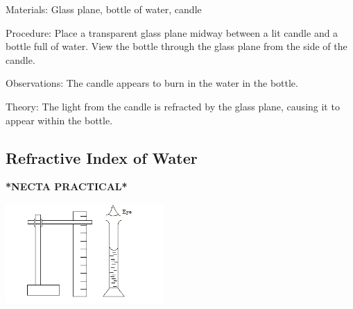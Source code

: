\begin{multicols}{2}
\begin{description*}
\item[Materials:]{Glass plane, bottle of water, candle}
\item[Procedure:]{Place a transparent glass plane midway between a lit candle and a bottle full of water. View the bottle through the glass plane from the side of the candle.}
\item[Observations:]{The candle appears to burn in the water in the bottle.}
\item[Theory:]{The light from the candle is refracted by the glass plane, causing it to appear within the bottle.}
\end{description*}

\subsection{Refractive Index of Water}  
\textbf{*NECTA PRACTICAL*}

\begin{center}
\includegraphics[width=0.45\textwidth]{./img/refractive-index-water.png}
\end{center}


\end{multicols}
